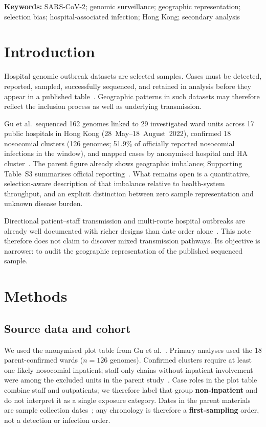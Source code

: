 \documentclass[11pt]{article}
\begin{document}
\noindent\textbf{Keywords:}
SARS-CoV-2; genomic surveillance; geographic representation; selection bias; hospital-associated infection; Hong Kong; secondary analysis

\section{Introduction}

Hospital genomic outbreak datasets are selected samples.
Cases must be detected, reported, sampled, successfully sequenced, and retained in analysis before they appear in a published table~\cite{oltean2023eid,stirrup2022hoci,benoit2023ash}.
Geographic patterns in such datasets may therefore reflect the inclusion process as well as underlying transmission.

Gu et al.\ sequenced 162 genomes linked to 29 investigated ward units across 17 public hospitals in Hong Kong (28~May--18~August~2022), confirmed 18 nosocomial clusters (126 genomes; 51.9\% of officially reported nosocomial infections in the window), and mapped cases by anonymised hospital and HA cluster~\cite{gu2026hai}.
The parent figure already shows geographic imbalance; Supporting Table~S3 summarises official reporting~\cite{gu2026hai}.
What remains open is a quantitative, selection-aware description of that imbalance relative to health-system throughput, and an explicit distinction between zero sample representation and unknown disease burden.

Directional patient--staff transmission and multi-route hospital outbreaks are already well documented with richer designs than date order alone~\cite{lindsey2022natcomms,ellingford2021elife,cook2023frontiers}.
This note therefore does not claim to discover mixed transmission pathways.
Its objective is narrower: to audit the geographic representation of the published sequenced sample.

\section{Methods}

\subsection{Source data and cohort}
We used the anonymised plot table from Gu et al.~\cite{gu2026hai}.
Primary analyses used the 18 parent-confirmed wards ($n=126$ genomes).
Confirmed clusters require at least one likely nosocomial inpatient; staff-only chains without inpatient involvement were among the excluded units in the parent study~\cite{gu2026hai}.
Case roles in the plot table combine staff and outpatients; we therefore label that group \textbf{non-inpatient} and do not interpret it as a single exposure category.
Dates in the parent materials are sample collection dates~\cite{gu2026hai}; any chronology is therefore a \textbf{first-sampling} order, not a detection or infection order.
\end{document}
